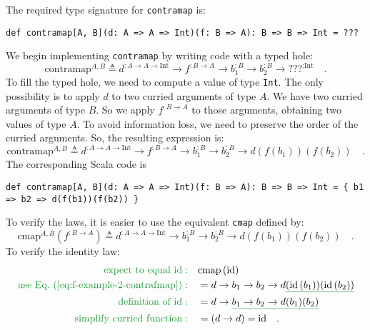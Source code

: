 The required type signature for \lstinline!contramap! is:
\begin{lstlisting}
def contramap[A, B](d: A => A => Int)(f: B => A): B => B => Int = ???
\end{lstlisting}
We begin implementing \lstinline!contramap! by writing code with
a typed hole:
\[
\text{contramap}^{A,B}\triangleq d^{:A\rightarrow A\rightarrow\text{Int}}\rightarrow f^{:B\rightarrow A}\rightarrow b_{1}^{:B}\rightarrow b_{2}^{:B}\rightarrow\text{???}^{:\text{Int}}\quad.
\]
To fill the typed hole, we need to compute a value of type \lstinline!Int!.
The only possibility is to apply $d$ to two curried arguments of
type $A$. We have two curried arguments of type $B$. So we apply
$f^{:B\rightarrow A}$ to those arguments, obtaining two values of
type $A$. To avoid information loss, we need to preserve the order
of the curried arguments. So, the resulting expression is:
\[
\text{contramap}^{A,B}\triangleq d^{:A\rightarrow A\rightarrow\text{Int}}\rightarrow f^{:B\rightarrow A}\rightarrow b_{1}^{:B}\rightarrow b_{2}^{:B}\rightarrow d\left(f(b_{1})\right)\left(f(b_{2})\right)\quad.
\]
The corresponding Scala code is 
\begin{lstlisting}
def contramap[A, B](d: A => A => Int)(f: B => A): B => B => Int = { b1 => b2 => d(f(b1))(f(b2)) }
\end{lstlisting}
To verify the laws, it is easier to use the equivalent \lstinline!cmap!
defined by:
\begin{equation}
\text{cmap}^{A,B}(f^{:B\rightarrow A})\triangleq d^{:A\rightarrow A\rightarrow\text{Int}}\rightarrow b_{1}^{:B}\rightarrow b_{2}^{:B}\rightarrow d\left(f(b_{1})\right)\left(f(b_{2})\right)\quad.\label{eq:f-example-2-contrafmap}
\end{equation}
To verify the identity law:
\begin{align*}
{\color{greenunder}\text{expect to equal }\text{id}:}\quad & \text{cmap}\left(\text{id}\right)\\
{\color{greenunder}\text{use Eq.~(\ref{eq:f-example-2-contrafmap})}:}\quad & =d\rightarrow b_{1}\rightarrow b_{2}\rightarrow d\gunderline{\left(\text{id}\,(b_{1})\right)}\gunderline{\left(\text{id}\,(b_{2})\right)}\\
{\color{greenunder}\text{definition of }\text{id}:}\quad & =d\rightarrow\gunderline{b_{1}\rightarrow b_{2}\rightarrow d(b_{1})(b_{2})}\\
{\color{greenunder}\text{simplify curried function}:}\quad & =\left(d\rightarrow d\right)=\text{id}\quad.
\end{align*}
